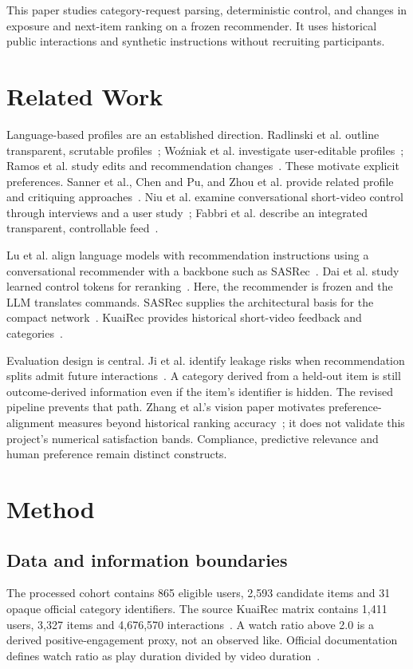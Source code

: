 \documentclass[conference]{IEEEtran}
\begin{document}
This paper studies category-request parsing, deterministic control, and changes in exposure and next-item ranking on a frozen recommender. It uses historical public interactions and synthetic instructions without recruiting participants.

\section{Related Work}
Language-based profiles are an established direction. Radlinski et al. outline transparent, scrutable profiles~\cite{radlinski2022profiles}; Wo\'{z}niak et al. investigate user-editable profiles~\cite{wozniak2025profiles}; Ramos et al. study edits and recommendation changes~\cite{ramos2024transparent}. These motivate explicit preferences. Sanner et al., Chen and Pu, and Zhou et al. provide related profile and critiquing approaches~\cite{sanner2023competitive,chen2012critiquing,zhou2024language}. Niu et al. examine conversational short-video control through interviews and a user study~\cite{niu2025chat}; Fabbri et al. describe an integrated transparent, controllable feed~\cite{fabbri2026feeding}.

Lu et al. align language models with recommendation instructions using a conversational recommender with a backbone such as SASRec~\cite{lu2024aligning}. Dai et al. study learned control tokens for reranking~\cite{dai2025token}. Here, the recommender is frozen and the LLM translates commands. SASRec supplies the architectural basis for the compact network~\cite{kang2018sasrec}. KuaiRec provides historical short-video feedback and categories~\cite{gao2022kuairec}.

Evaluation design is central. Ji et al. identify leakage risks when recommendation splits admit future interactions~\cite{ji2023leakage}. A category derived from a held-out item is still outcome-derived information even if the item's identifier is hidden. The revised pipeline prevents that path. Zhang et al.'s vision paper motivates preference-alignment measures beyond historical ranking accuracy~\cite{zhang2026context}; it does not validate this project's numerical satisfaction bands. Compliance, predictive relevance and human preference remain distinct constructs.

\section{Method}
\subsection{Data and information boundaries}
The processed cohort contains 865 eligible users, 2,593 candidate items and 31 opaque official category identifiers. The source KuaiRec matrix contains 1,411 users, 3,327 items and 4,676,570 interactions~\cite{gao2022kuairec}. A watch ratio above 2.0 is a derived positive-engagement proxy, not an observed like. Official documentation defines watch ratio as play duration divided by video duration~\cite{kuairecdocs}.
\end{document}
